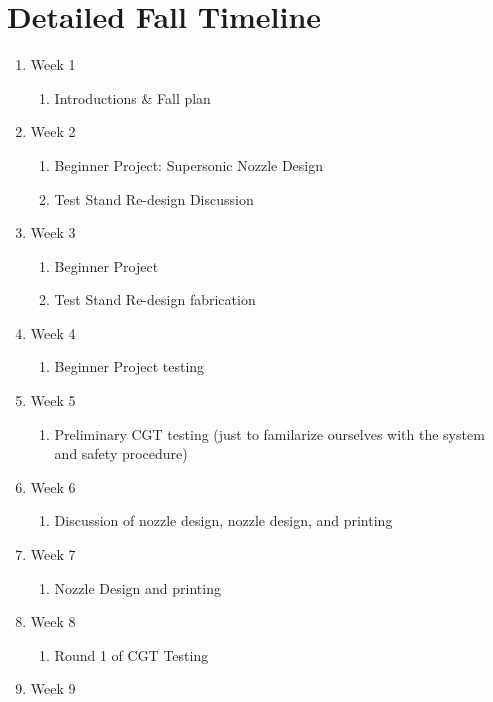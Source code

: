 \documentclass[conference]{IEEEtran} %
\begin{document}
\onecolumn
\appendices{}
\section{\textbf{Detailed Fall Timeline}}
\centering
\begin{enumerate}
  \item Week 1
  \begin{enumerate}
    \item Introductions \& Fall plan
  \end{enumerate}
  \item Week 2
  \begin{enumerate}
    \item Beginner Project: Supersonic Nozzle Design
    \item Test Stand Re-design Discussion
  \end{enumerate}
  \item Week 3
  \begin{enumerate}
    \item Beginner Project
    \item Test Stand Re-design fabrication
  \end{enumerate}
  \item Week 4
  \begin{enumerate}
    \item Beginner Project testing
  \end{enumerate}
  \item Week 5
  \begin{enumerate}
    \item Preliminary CGT testing (just to familarize ourselves with the system and safety procedure)
  \end{enumerate}
  \item Week 6
  \begin{enumerate}
    \item Discussion of nozzle design, nozzle design, and printing
  \end{enumerate}
  \item Week 7
  \begin{enumerate}
    \item Nozzle Design and printing
  \end{enumerate}
  \item Week 8
  \begin{enumerate}
    \item Round 1 of CGT Testing
  \end{enumerate}
  \item Week 9

\end{enumerate}
\end{document}
